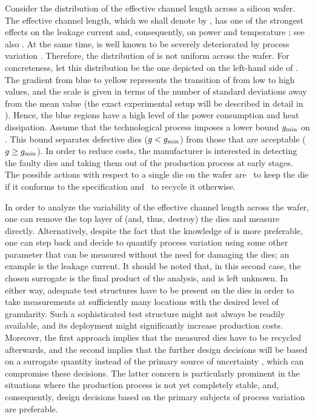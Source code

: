 Consider the distribution of the effective channel length across a silicon
wafer. The effective channel length, which we shall denote by \g, has one of the
strongest effects on the leakage current and, consequently, on power and
temperature \cite{juan2012}; see also . At the same time,
\g is well known to be severely deteriorated by process variation
\cite{chandrakasan2000, srivastava2010}. Therefore, the distribution of \g is
not uniform across the wafer. For concreteness, let this distribution be the one
depicted on the left-hand side of . The gradient from
blue to yellow represents the transition of \g from low to high values, and the
scale is given in terms of the number of standard deviations away from the mean
value (the exact experimental setup will be described in detail in
). Hence, the blue regions have a high level of the
power consumption and heat dissipation. Assume that the technological process
imposes a lower bound $g_{\mathrm{min}}$ on \g. This bound separates defective dies
($g < g_{\mathrm{min}}$) from those that are acceptable ($g \geq g_{\mathrm{min}}$). In
order to reduce costs, the manufacturer is interested in detecting the faulty
dies and taking them out of the production process at early stages. The possible
actions with respect to a single die on the wafer are \one~to keep the die if it
conforms to the specification and \two~to recycle it otherwise.

In order to analyze the variability of the effective channel length \g across
the wafer, one can remove the top layer of (and, thus, destroy) the dies and
measure \g directly. Alternatively, despite the fact that the knowledge of \g is
more preferable, one can step back and decide to quantify process variation
using some other parameter \h that can be measured without the need for damaging
the dies; an example is the leakage current. It should be noted that, in this
second case, the chosen surrogate is the final product of the analysis, and \g
is left unknown. In either way, adequate test structures have to be present on
the dies in order to take measurements at sufficiently many locations with the
desired level of granularity. Such a sophisticated test structure might not
always be readily available, and its deployment might significantly increase
production costs. Moreover, the first approach implies that the measured dies
have to be recycled afterwards, and the second implies that the further design
decisions will be based on a surrogate quantity \h instead of the primary source
of uncertainty \g, which can compromise these decisions. The latter concern is
particularly prominent in the situations where the production process is not yet
completely stable, and, consequently, design decisions based on the primary
subjects of process variation are preferable.


